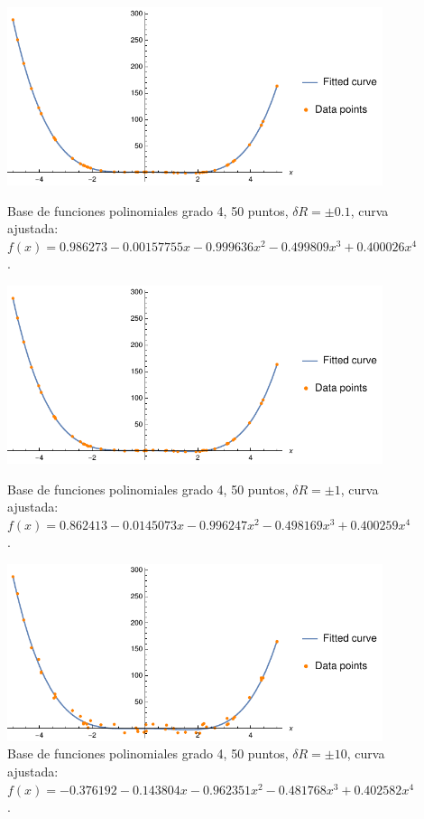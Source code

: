 \documentclass[11pt,letterpaper]{article}
\begin{document}
\begin{figure}
\centering
\includegraphics[width=11cm]{poly_01}
\caption{Base de funciones polinomiales grado 4, 50 puntos, $\delta R=\pm 0.1$,
curva ajustada: $f(x)=0.986273 - 0.00157755 x - 0.999636 x^2 - 0.499809 x^3 + 0.400026 x^4$.}
\includegraphics[width=11cm]{poly_02}
\caption{Base de funciones polinomiales grado 4, 50 puntos, $\delta R=\pm 1$,
curva ajustada: $f(x)=0.862413 - 0.0145073 x - 0.996247 x^2 - 0.498169 x^3 + 0.400259 x^4$.}
\includegraphics[width=11cm]{poly_03}
\caption{Base de funciones polinomiales grado 4, 50 puntos, $\delta R=\pm 10$,
curva ajustada: $f(x)=-0.376192 - 0.143804 x - 0.962351 x^2 - 0.481768 x^3 + 0.402582 x^4$.}
\label{fig:poly_50pts}
\end{figure}
\end{document}
